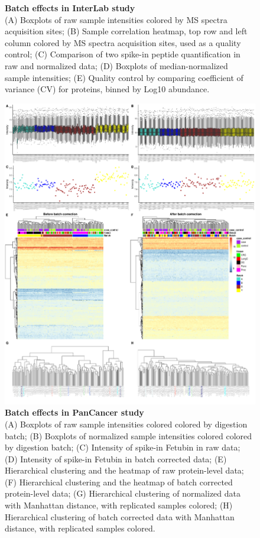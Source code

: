\documentclass[num-refs]{wiley-article}
\begin{document}
\begin{figure}
	\caption{\textbf{Batch effects in InterLab study}\\
		 \footnotesize  (A) Boxplots of raw sample intensities colored by MS spectra acquisition sites; (B) Sample correlation heatmap, top row and left column colored by MS spectra acquisition sites, used as a quality control; (C) Comparison of two spike-in peptide quantification in raw and normalized data; (D) Boxplots of median-normalized sample intensities; (E) Quality control by comparing coefficient of variance (CV) for proteins, binned by Log10 abundance.}
	\label{fig:batch_figS1_InterLab}
\end{figure}

\begin{figure}
	\includegraphics[width=\textwidth]{figures/Supp_Fig2_PanCancer}
	
	\caption{\textbf{Batch effects in PanCancer study} \\
		\footnotesize (A) Boxplots of raw sample intensities colored colored by digestion batch; (B) Boxplots of normalized sample intensities colored colored by digestion batch; 
		(C) Intensity of spike-in Fetubin in raw data; (D) Intensity of spike-in Fetubin in batch corrected data; (E) Hierarchical clustering and the heatmap of raw protein-level data; (F) Hierarchical clustering and the heatmap of batch corrected protein-level data; (G) Hierarchical clustering of normalized data with Manhattan distance, with replicated samples colored; (H) Hierarchical clustering of batch corrected data with Manhattan distance, with replicated samples colored.}
	\label{fig:batch_figS2_PanCancer}
\end{figure}
\end{document}
